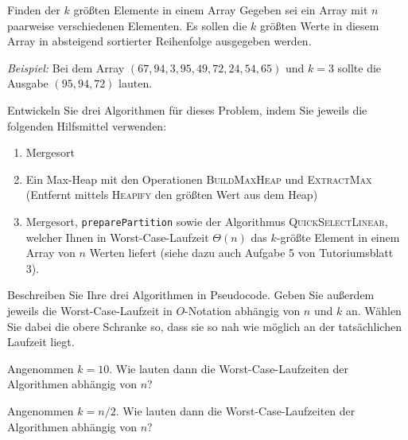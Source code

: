 \documentclass[11pt,a4paper]{article}
\begin{document}
\begin{aufgabe}{3}{Finden der $k$ größten Elemente in einem Array}
    Gegeben sei ein Array mit $n$ paarweise verschiedenen Elementen. Es sollen die $k$ größten Werte in diesem Array in absteigend sortierter Reihenfolge ausgegeben werden.

    \textit{Beispiel:} Bei dem Array $(67, 94, 3, 95, 49, 72, 24, 54, 65)$ und $k = 3$ sollte die Ausgabe $(95, 94, 72)$ lauten.

    Entwickeln Sie drei Algorithmen für dieses Problem, indem Sie jeweils die folgenden Hilfsmittel verwenden:
    \begin{enumerate}
        \item Mergesort
        \item Ein Max-Heap mit den Operationen \textsc{BuildMaxHeap} und \textsc{ExtractMax} (Entfernt mittels \textsc{Heapify} den größten Wert aus dem Heap)
        \item Mergesort, \texttt{preparePartition} sowie der Algorithmus \textsc{QuickSelectLinear}, welcher Ihnen in Worst-Case-Laufzeit $\Theta(n)$ das $k$-größte Element in einem Array von $n$ Werten liefert (siehe dazu auch Aufgabe 5 von Tutoriumsblatt 3).
    \end{enumerate}

    Beschreiben Sie Ihre drei Algorithmen in Pseudocode. Geben Sie außerdem jeweils die Worst-Case-Laufzeit in $O$-Notation abhängig von $n$ und $k$ an.
    Wählen Sie dabei die obere Schranke so, dass sie so nah wie möglich an der tatsächlichen Laufzeit liegt.

    Angenommen $k = 10$. Wie lauten dann die Worst-Case-Laufzeiten der Algorithmen abhängig von $n$?

    Angenommen $k = n / 2$. Wie lauten dann die Worst-Case-Laufzeiten der Algorithmen abhängig von $n$?
\end{aufgabe}
\end{document}
